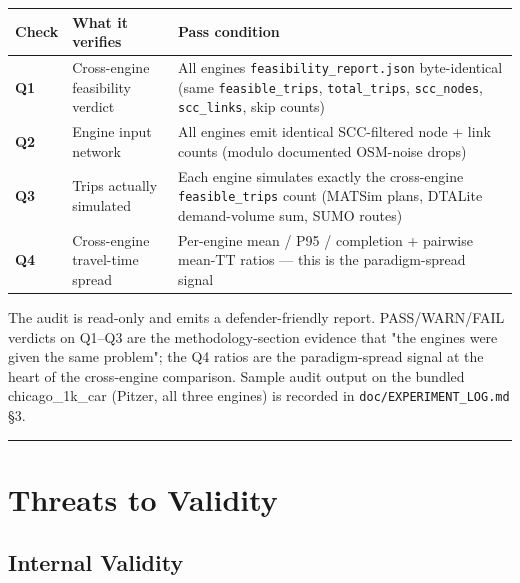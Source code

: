 \begin{longtable}[]{@{}lll@{}}
\toprule\noalign{}
Check & What it verifies & Pass condition \\
\midrule\noalign{}
\endhead
\bottomrule\noalign{}
\endlastfoot
\textbf{Q1} & Cross-engine feasibility verdict & All
engines\textquotesingle{} \texttt{feasibility\_report.json}
byte-identical (same \texttt{feasible\_trips}, \texttt{total\_trips},
\texttt{scc\_nodes}, \texttt{scc\_links}, skip counts) \\
\textbf{Q2} & Engine input network & All engines emit identical
SCC-filtered node + link counts (modulo documented OSM-noise drops) \\
\textbf{Q3} & Trips actually simulated & Each engine simulates exactly
the cross-engine \texttt{feasible\_trips} count (MATSim plans, DTALite
demand-volume sum, SUMO routes) \\
\textbf{Q4} & Cross-engine travel-time spread & Per-engine mean / P95 /
completion + pairwise mean-TT ratios --- this is the paradigm-spread
signal \\
\end{longtable}

\begin{Shaded}
\begin{Highlighting}[]
 
\end{Highlighting}
\end{Shaded}

The audit is read-only and emits a defender-friendly report.
PASS/WARN/FAIL verdicts on Q1--Q3 are the methodology-section evidence
that "the engines were given the same problem"; the Q4 ratios are the
paradigm-spread signal at the heart of the cross-engine comparison.
Sample audit output on the bundled chicago\_1k\_car (Pitzer, all three
engines) is recorded in \texttt{doc/EXPERIMENT\_LOG.md} §3.

\begin{center}\rule{0.5\linewidth}{0.5pt}\end{center}

\section{Threats to Validity}\label{46-threats-to-validity}

\subsection{Internal Validity}\label{461-internal-validity}

